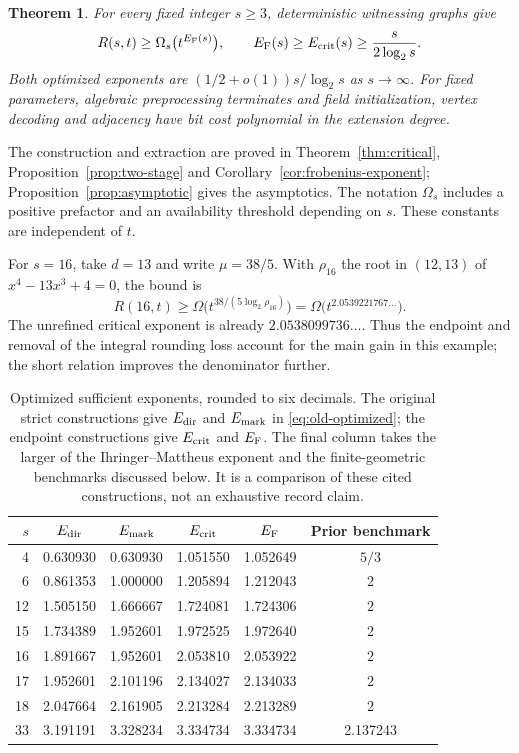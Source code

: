 \documentclass[11pt,a4paper]{article}
\newtheorem{theorem}{Theorem}[section]
\theoremstyle{definition}
\theoremstyle{remark}
\numberwithin{equation}{section}
\begin{document}
\begin{theorem}\label{thm:main}
For every fixed integer $s\ge3$, deterministic witnessing graphs give
\[
R(s,t)\ge\Omega_s\bigl(t^{E_{\rm F}(s)}\bigr),\qquad
E_{\rm F}(s)\ge E_{\rm crit}(s)\ge\frac{s}{2\log_2s}.
\]
Both optimized exponents are $(1/2+o(1))s/\log_2s$ as $s\to\infty$. For fixed parameters, algebraic preprocessing terminates and field initialization, vertex decoding and adjacency have bit cost polynomial in the extension degree.
\end{theorem}


The construction and extraction are proved in Theorem~\ref{thm:critical}, Proposition~\ref{prop:two-stage} and Corollary~\ref{cor:frobenius-exponent}; Proposition~\ref{prop:asymptotic} gives the asymptotics. The notation $\Omega_s$ includes a positive prefactor and an availability threshold depending on $s$. These constants are independent of $t$.

For $s=16$, take $d=13$ and write $\mu=38/5$. With $\rho_{16}$ the root in $(12,13)$ of $x^4-13x^3+4=0$, the bound is
\[
R(16,t)\ge\Omega\bigl(t^{38/(5\log_2\rho_{16})}\bigr)
=\Omega\bigl(t^{2.0539221767\ldots}\bigr).
\]
The unrefined critical exponent is already $2.0538099736\ldots$. Thus the endpoint and removal of the integral rounding loss account for the main gain in this example; the short relation improves the denominator further.

\begin{table}[t]
\centering\small
\setlength{\tabcolsep}{5pt}
\begin{tabular}{rccccc}
\toprule
$s$ & $E_{\rm dir}$ & $E_{\rm mark}$ & $E_{\rm crit}$ & $E_{\rm F}$ & Prior benchmark\\
\midrule
4  & 0.630930 & 0.630930 & 1.051550 & 1.052649 & $5/3$\\
6  & 0.861353 & 1.000000 & 1.205894 & 1.212043 & $2$\\
12 & 1.505150 & 1.666667 & 1.724081 & 1.724306 & $2$\\
15 & 1.734389 & 1.952601 & 1.972525 & 1.972640 & $2$\\
16 & 1.891667 & 1.952601 & 2.053810 & 2.053922 & $2$\\
17 & 1.952601 & 2.101196 & 2.134027 & 2.134033 & $2$\\
18 & 2.047664 & 2.161905 & 2.213284 & 2.213289 & $2$\\
33 & 3.191191 & 3.328234 & 3.334734 & 3.334734 & 2.137243\\
\bottomrule
\end{tabular}
\caption{Optimized sufficient exponents, rounded to six decimals. The original strict constructions give $E_{\rm dir}$ and $E_{\rm mark}$ in \eqref{eq:old-optimized}; the endpoint constructions give $E_{\rm crit}$ and $E_{\rm F}$. The final column takes the larger of the Ihringer--Mattheus exponent and the finite-geometric benchmarks discussed below. It is a comparison of these cited constructions, not an exhaustive record claim.}\label{tab:comparison}
\end{table}
\end{document}
